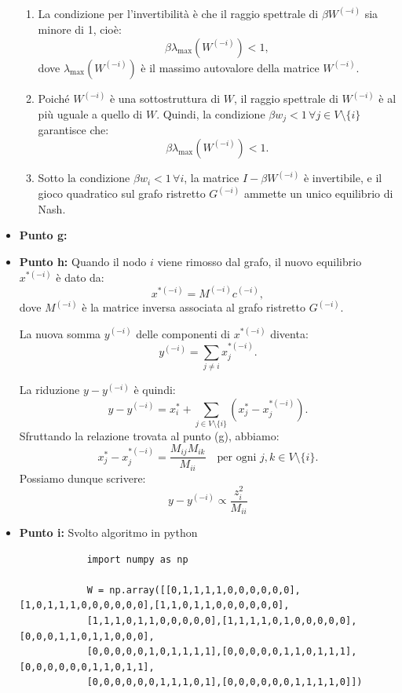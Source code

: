 \documentclass[a4paper,12pt]{article}
\begin{document}
\begin{itemize}
\begin{enumerate}
			\item {} La condizione per l'invertibilità è che il raggio spettrale di $\beta W^{(-i)}$ sia minore di 1, cioè:
			$$
			\beta \lambda_{\text{max}}(W^{(-i)}) < 1,
			$$
			dove $\lambda_{\text{max}}(W^{(-i)})$ è il massimo autovalore della matrice $W^{(-i)}$.
			
			\item {} Poiché $W^{(-i)}$ è una sottostruttura di $W$, il raggio spettrale di $W^{(-i)}$ è al più uguale a quello di $W$. Quindi, la condizione $\beta w_j < 1 \, \forall j \in V \setminus \{i\}$ garantisce che:
			$$
			\beta \lambda_{\text{max}}(W^{(-i)}) < 1.
			$$
			
			\item {} Sotto la condizione $\beta w_i < 1 \, \forall i$, la matrice $I - \beta W^{(-i)}$ è invertibile, e il gioco quadratico sul grafo ristretto $G^{(-i)}$ ammette un unico equilibrio di Nash.
		\end{enumerate}
		
		\item \textbf{Punto g: }
		\item \textbf{Punto h: }
		Quando il nodo $i$ viene rimosso dal grafo, il nuovo equilibrio $x^{*(-i)}$ è dato da:
		$$
		x^{*(-i)} = M^{(-i)} c^{(-i)},
		$$
		dove $M^{(-i)}$ è la matrice inversa associata al grafo ristretto $G^{(-i)}$. 
		
		La nuova somma $y^{(-i)}$ delle componenti di $x^{*(-i)}$ diventa:
		$$
		y^{(-i)} = \sum_{j \neq i} x_j^{*(-i)}.
		$$
		
		La riduzione $y - y^{(-i)}$ è quindi:
		$$
		y - y^{(-i)} = x_i^* + \sum_{j \in V \setminus \{i\}} \left(x_j^* - x_j^{*(-i)}\right).
		$$
		Sfruttando la relazione trovata al punto (g), abbiamo:
		\[
		x_j^* - x_j^{*(-i)} = \frac{M_{ij}M_{ik}}{M_{ii}} \quad \text{per ogni } j, k \in V \setminus \{i\}.
		\]
		Possiamo dunque scrivere:\\
		\[
		y - y^{(-i)} \propto \frac{z_i^2}{M_{ii}}
		\]
		
		\item \textbf{Punto i: }
		Svolto algoritmo in python
		\begin{verbatim}
			import numpy as np
			
			W = np.array([[0,1,1,1,1,0,0,0,0,0,0],[1,0,1,1,1,0,0,0,0,0,0],[1,1,0,1,1,0,0,0,0,0,0],
			[1,1,1,0,1,1,0,0,0,0,0],[1,1,1,1,0,1,0,0,0,0,0],[0,0,0,1,1,0,1,1,0,0,0],
			[0,0,0,0,0,1,0,1,1,1,1],[0,0,0,0,0,1,1,0,1,1,1],[0,0,0,0,0,0,1,1,0,1,1],
			[0,0,0,0,0,0,1,1,1,0,1],[0,0,0,0,0,0,1,1,1,1,0]])
			

\end{verbatim}
\end{itemize}
\end{document}

